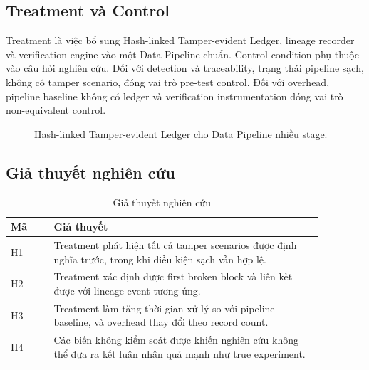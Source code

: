 \subsection{Treatment và Control}

Treatment là việc bổ sung Hash-linked Tamper-evident Ledger, lineage recorder và verification engine vào một Data Pipeline chuẩn. Control condition phụ thuộc vào câu hỏi nghiên cứu. Đối với detection và traceability, trạng thái pipeline sạch, không có tamper scenario, đóng vai trò pre-test control. Đối với overhead, pipeline baseline không có ledger và verification instrumentation đóng vai trò non-equivalent control.

\begin{figure}[t]
\centering
{}
\caption{Hash-linked Tamper-evident Ledger cho Data Pipeline nhiều stage.}
\label{fig:architecture}
\end{figure}

\subsection{Giả thuyết nghiên cứu}

\begin{table}[t]
\caption{Giả thuyết nghiên cứu}
\centering
\begin{tabular}{p{0.12\linewidth}p{0.75\linewidth}}
\toprule
\textbf{Mã} & \textbf{Giả thuyết} \\
\midrule
H1 & Treatment phát hiện tất cả tamper scenarios được định nghĩa trước, trong khi điều kiện sạch vẫn hợp lệ. \\
H2 & Treatment xác định được first broken block và liên kết được với lineage event tương ứng. \\
H3 & Treatment làm tăng thời gian xử lý so với pipeline baseline, và overhead thay đổi theo record count. \\
H4 & Các biến không kiểm soát được khiến nghiên cứu không thể đưa ra kết luận nhân quả mạnh như true experiment. \\
\bottomrule
\end{tabular}
\label{tab:hypotheses}
\end{table}

